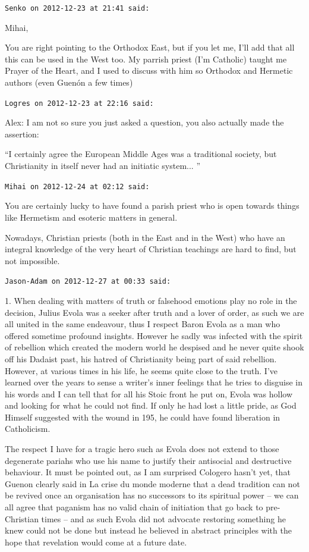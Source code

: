 \begin{footnotesize}
\begin{sffamily}
\hfill

\texttt{Senko on 2012-12-23 at 21:41 said:}

Mihai,

You are right pointing to the Orthodox East, but if you let me, I'll add that all this can be used in the West too. My parrish priest (I'm Catholic) taught me Prayer of the Heart, and I used to discuss with him so Orthodox and Hermetic authors (even Guenón a few times)

\hfill

\texttt{Logres on 2012-12-23 at 22:16 said:}

Alex: I am not so sure you just asked a question, you also actually made the assertion:

``I certainly agree the European Middle Ages was a traditional society, but Christianity in itself never had an initiatic system... ''

\hfill

\texttt{Mihai on 2012-12-24 at 02:12 said:}

You are certainly lucky to have found a parish priest who is open towards things like Hermetism and esoteric matters in general.

Nowadays, Christian priests (both in the East and in the West) who have an integral knowledge of the very heart of Christian teachings are hard to find, but not impossible.

\hfill

\texttt{Jason-Adam on 2012-12-27 at 00:33 said:}

1. When dealing with matters of truth or falsehood emotions play no role in the decision, Julius Evola was a seeker after truth and a lover of order, as such we are all united in the same endeavour, thus I respect Baron Evola as a man who offered sometime profound insights. However he sadly was infected with the spirit of rebellion which created the modern world he despised and he never quite shook off his Dadaist past, his hatred of Christianity being part of said rebellion. However, at various times in his life, he seems quite close to the truth. I've learned over the years to sense a writer's inner feelings that he tries to disguise in his words and I can tell that for all his Stoic front he put on, Evola was hollow and looking for what he could not find. If only he had lost a little pride, as God Himself suggested with the wound in 195, he could have found liberation in Catholicism.

The respect I have for a tragic hero such as Evola does not extend to those degenerate pariahs who use his name to justify their antisocial and destructive behaviour. It must be pointed out, as I am surprised Cologero hasn't yet, that Guenon clearly said in La crise du monde moderne that a dead tradition can not be revived once an organisation has no successors to its spiritual power -- we can all agree that paganism has no valid chain of initiation that go back to pre-Christian times -- and as such Evola did not advocate restoring something he knew could not be done but instead he believed in abstract principles with the hope that revelation would come at a future date.


\end{sffamily}
\end{footnotesize}
